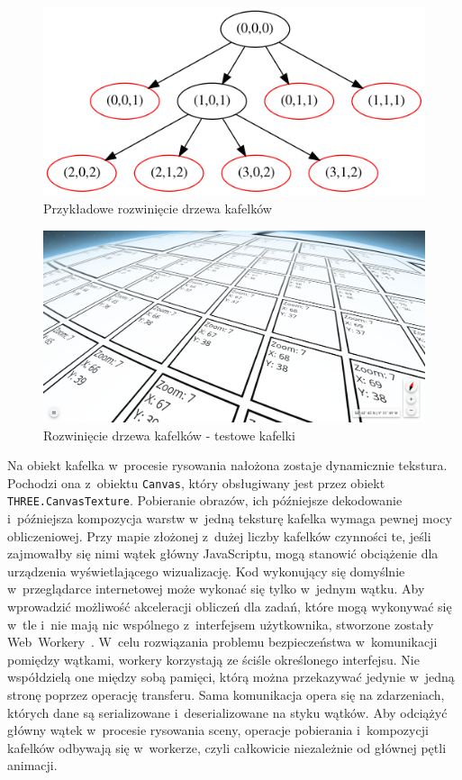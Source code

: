 \begin{figure}[h]
  \centering
  \includegraphics[scale=0.4]{diagrams/out/c4_tilesTree.png}
  \caption{Przykładowe rozwinięcie drzewa kafelków}
  \label{fig:c4_tilesTree} 
\end{figure}

\begin{figure} 
  \centering
  \includegraphics[width=\linewidth]{img/c4_osmTilesVis_custom.png}
  \caption{Rozwinięcie drzewa kafelków - testowe kafelki}
  \label{fig:c4_osmTilesVis_custom} 
\end{figure}

Na obiekt kafelka w~procesie rysowania nałożona zostaje dynamicznie tekstura. Pochodzi ona z~obiektu \texttt{Canvas}, który obsługiwany jest przez obiekt \texttt{THREE.CanvasTexture}. Pobieranie obrazów, ich późniejsze dekodowanie i~późniejsza kompozycja warstw w~jedną teksturę kafelka wymaga pewnej mocy obliczeniowej. Przy mapie złożonej z~dużej liczby kafelków czynności te, jeśli zajmowałby się nimi wątek główny JavaScriptu, mogą stanowić obciążenie dla urządzenia wyświetlającego wizualizację. Kod wykonujący się domyślnie w~przeglądarce internetowej może wykonać się tylko w~jednym wątku. Aby wprowadzić możliwość akceleracji obliczeń dla zadań, które mogą wykonywać się w~tle i~nie mają nic wspólnego z~interfejsem użytkownika, stworzone zostały Web~Workery~\cite{Workers}. W~celu rozwiązania problemu bezpieczeństwa w~komunikacji pomiędzy wątkami, workery korzystają ze ściśle określonego interfejsu. Nie współdzielą one między sobą pamięci, którą można przekazywać jedynie w~jedną stronę poprzez operację transferu. Sama komunikacja opera się na zdarzeniach, których dane są serializowane i~deserializowane na styku wątków. Aby odciążyć główny wątek w~procesie rysowania sceny, operacje pobierania i~kompozycji kafelków odbywają się w~workerze, czyli całkowicie niezależnie od głównej pętli animacji.

